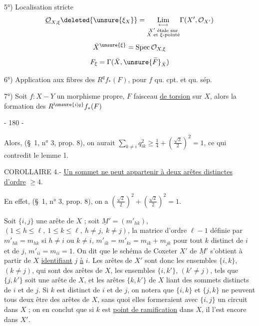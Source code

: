 5°) Localisation stricte
\[
\underline{\mathcal O}_{X,\xi}\deleted{\unsure{\xi_X}}
=\underset{\substack{X'\text{ étale sur}\\X\text{ et }\xi\text{-pointé}}}{\underset{\longleftrightarrow}{\operatorname{Lim}}}
\Gamma(X',\mathcal O_{X'})
\]
\[
\bar X^{\unsure{\xi}}=\operatorname{Spec}\mathcal O_{X,\xi}
\]
\[
F_\xi=\Gamma(\bar X,\unsure{\widetilde F}_{\bar X})
\]

6°) Application aux fibres des $R^qf_*(F)$, pour $f$ qu. cpt. et qu. sép.


7°)  Soit $f:X-Y$ un morphisme propre, $F$ faisceau \uline{de torsion} sur $X$, alors la formation des $R^{\unsure{i|q}}f_*(F)$
\begin{center}- 180 -\end{center}

Alors, (\S\ 1, n° 3, prop. 8), on aurait $\displaystyle\sum_{k\ne i}q_{ik}^2\geq\frac14+(\frac{\sqrt3}{2})^2=1$, ce qui contredit le lemme 1.

COROLLAIRE 4.- \uline{Un sommet ne peut appartenir à deux arêtes distinctes d'ordre} $\geq4$.

En effet, (\S\ 1, n° 3, prop. 8), on a $(\frac{\sqrt2}{2})^2+(\frac{\sqrt2}{2})^2=1$.

Soit $\{i,j\}$ une arête de $X$ ; soit $\underline M'=(m'_{hk})$, $(1\leq h\leq\ell,\ 1\leq k\leq\ell,\ h\ne j,\ k\ne j)$, la matrice d'ordre $\ell-1$ définie par $m'_{hk}=m_{hk}$ si $h\ne i$ ou $k\ne i$, $m'_{ik}=m'_{ki}=m_{ik}+m_{jk}$ pour tout $k$ distinct de $i$ et de $j$, $m'_{ii}=m_{ii}=1$. On dit que le schéma de Coxeter $X'$ de $\underline M'$ s'obtient à partir de $X$ \uline{identifiant} $j$ \uline{à} $i$. Les arêtes de $X'$ sont donc les ensembles $\{i,k\}$, $(k\ne j)$, qui sont des arêtes de $X$, les ensembles $\{i,k'\}$, $(k'\ne j)$, tels que $\{j,k'\}$ soit une arête de $X$, et les arêtes $\{k,k'\}$ de $X$ liant des sommets distincts de $i$ et de $j$. Si $k$ est distinct de $i$ et de $j$, on notera que $\{i,k\}$ et $\{j,k\}$ ne peuvent tous deux être des arêtes de $X$, sans quoi elles formeraient avec $\{i,j\}$ un circuit dans $X$ ; on en conclut que si $k$ est \uline{point de ramification} dans $X$, il l'est encore dans $X'$.

